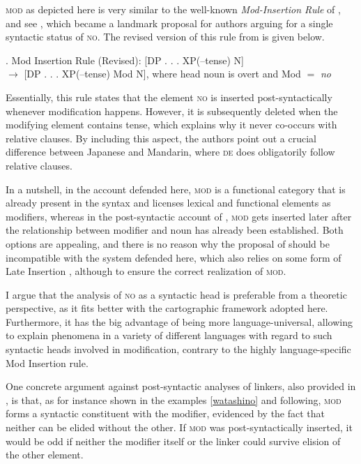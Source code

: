 \textsc{mod} as depicted here is very similar to the well-known \textit{Mod-Insertion Rule} of \citet{kitagawa:1982:prenominal}, and see \citet{watanabe:2010:notes}, which became a landmark proposal for authors arguing for a single syntactic status of \textsc{no}. The revised version of this rule from \citet{watanabe:2010:notes} is given below. 

\ex. Mod Insertion Rule (Revised): [DP . . . XP(–tense) N] \\ $\rightarrow$ [DP . . . XP(–tense) Mod N], where head noun is overt and Mod $=$ \textit{no} \\ \null \hfill \citep[66]{watanabe:2010:notes}

Essentially, this rule states that the element \textsc{no} is inserted post-syntactically whenever modification happens. However, it is subsequently deleted when the modifying element contains tense, which explains why it never co-occurs with relative clauses. By including this aspect, the authors point out a crucial difference between Japanese and Mandarin, where \textsc{de} does obligatorily follow relative clauses.

In a nutshell, in the account defended here, \textsc{mod} is a functional category that is already present in the syntax and licenses lexical and functional elements as modifiers, whereas in the post-syntactic account of \citet{kitagawa:1982:prenominal}, \textsc{mod} gets inserted later after the relationship between modifier and noun has already been established. Both options are appealing, and there is no reason why the proposal of \citet{kitagawa:1982:prenominal} should be incompatible with the system defended here, which also relies on some form of Late Insertion \citep{halle:1993:distributed, chomsky:2001:derivation}, although to ensure the correct realization of \textsc{mod}. 

I argue that the analysis of \textsc{no} as a syntactic head is preferable from a theoretic perspective, as it fits better with the cartographic framework adopted here. Furthermore, it has the big advantage of being more language-universal, allowing to explain phenomena in a variety of different languages with regard to such syntactic heads involved in modification, contrary to the highly language-specific Mod Insertion rule.

One concrete argument against post-syntactic analyses of linkers, also provided in \citet[54–55]{philip:2012:linkers}, is that, as for instance shown in the examples \ref{watashino} and following, \textsc{mod} forms a syntactic constituent with the modifier, evidenced by the fact that neither can be elided without the other. If \textsc{mod} was post-syntactically inserted, it would be odd if neither the modifier itself or the linker could survive elision of the other element.

